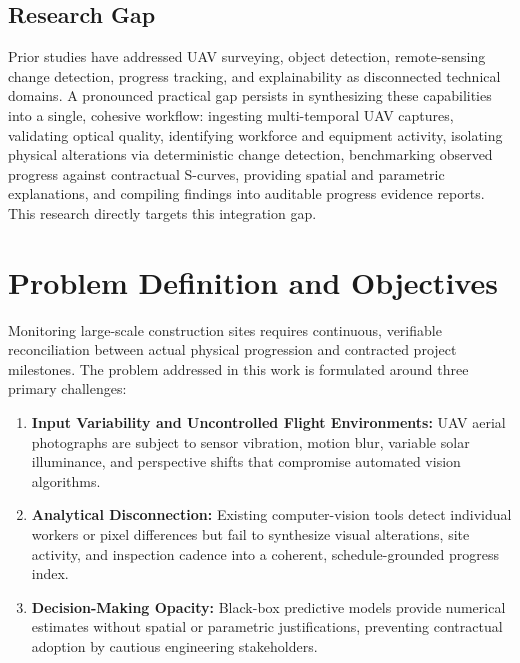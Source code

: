 \documentclass[conference]{IEEEtran}
\begin{document}
\subsection{Research Gap}
Prior studies have addressed UAV surveying, object detection, remote-sensing change detection, progress tracking, and explainability as disconnected technical domains. A pronounced practical gap persists in synthesizing these capabilities into a single, cohesive workflow: ingesting multi-temporal UAV captures, validating optical quality, identifying workforce and equipment activity, isolating physical alterations via deterministic change detection, benchmarking observed progress against contractual S-curves, providing spatial and parametric explanations, and compiling findings into auditable progress evidence reports. This research directly targets this integration gap.

\section{Problem Definition and Objectives}

Monitoring large-scale construction sites requires continuous, verifiable reconciliation between actual physical progression and contracted project milestones. The problem addressed in this work is formulated around three primary challenges:
\begin{enumerate}
    \item \textbf{Input Variability and Uncontrolled Flight Environments:} UAV aerial photographs are subject to sensor vibration, motion blur, variable solar illuminance, and perspective shifts that compromise automated vision algorithms.
    \item \textbf{Analytical Disconnection:} Existing computer-vision tools detect individual workers or pixel differences but fail to synthesize visual alterations, site activity, and inspection cadence into a coherent, schedule-grounded progress index.
    \item \textbf{Decision-Making Opacity:} Black-box predictive models provide numerical estimates without spatial or parametric justifications, preventing contractual adoption by cautious engineering stakeholders.
\end{enumerate}
\end{document}
